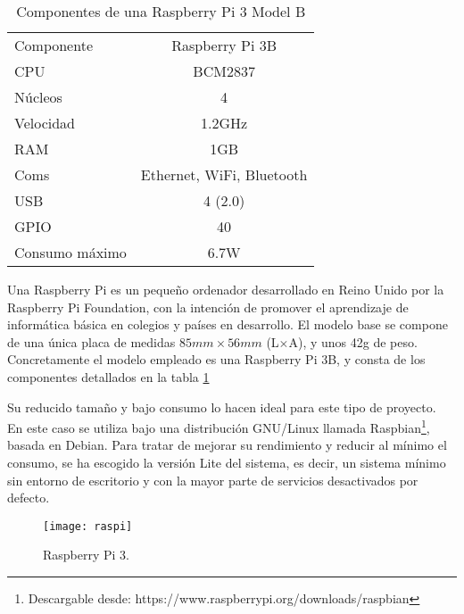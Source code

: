 \begin{table}
	\begin{center}
		\begin{tabular}{l | c}\hline
			\toprule
			Componente & Raspberry Pi 3B\\
			\otoprule
			CPU & BCM2837\\
			Núcleos & 4\\
			Velocidad & 1.2GHz\\
			RAM & 1GB\\
			Coms & Ethernet, WiFi, Bluetooth\\
			USB & 4 (2.0)\\
			GPIO & 40\\
			Consumo máximo & 6.7W\\
			\bottomrule
		\end{tabular}
		\caption{Componentes de una Raspberry Pi 3 Model B}
		\label{tb:raspi3hardware}
	\end{center}
\end{table}

\noindent Una Raspberry Pi es un pequeño ordenador desarrollado en Reino Unido por la Raspberry Pi Foundation, con la intención de promover el aprendizaje de informática básica en colegios y países en desarrollo. El modelo base se compone de una única placa de medidas $85mm \times 56mm$ (L$\times$A), y unos 42g de peso.\\Concretamente el modelo empleado es una Raspberry Pi 3B, y consta de los componentes detallados en la tabla \ref{tb:raspi3hardware}



\noindent Su reducido tamaño y bajo consumo lo hacen ideal para este tipo de proyecto. \\En este caso se utiliza bajo una distribución GNU/Linux llamada Raspbian\footnote{Descargable desde: https://www.raspberrypi.org/downloads/raspbian}, basada en Debian. Para tratar de mejorar su rendimiento y reducir al mínimo el consumo, se ha escogido la versión Lite del sistema, es decir, un sistema mínimo sin entorno de escritorio y con la mayor parte de servicios desactivados por defecto.

\begin{figure}
	\centering
	\texttt{[image: raspi]}
	\caption{Raspberry Pi 3.}\label{fig:raspi3b}
\end{figure}

